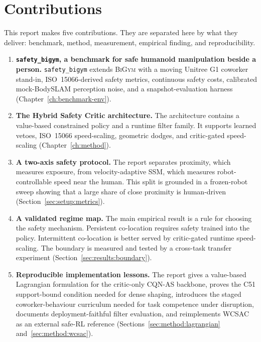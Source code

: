 \documentclass[11pt,a4paper]{report}
\newcommand{\ssm}{SSM}
\newcommand{\iso}{ISO~15066}
\newcommand{\bigym}{\textsc{BiGym}}
\newcommand{\sbigym}{\texttt{safety\_bigym}}
\newcommand{\cqnas}{CQN-AS}
\newcommand{\bodyslampp}{BodySLAM\nolinebreak[4]\hspace{-.05em}\raisebox{.2ex}{\scriptsize ++}}
\begin{document}
\section{Contributions}
\label{sec:intro:contributions}

This report makes five contributions. They are separated here by what
they deliver: benchmark, method, measurement, empirical finding, and
reproducibility.

\begin{enumerate}[leftmargin=2em,topsep=2pt,itemsep=2pt]
\item \textbf{\sbigym{}, a benchmark for safe humanoid manipulation
  beside a person.} \sbigym{} extends \bigym{} with a moving Unitree G1
  coworker stand-in, \iso{}-derived safety metrics, continuous safety
  costs, calibrated mock-\bodyslampp{} perception noise, and a
  snapshot-evaluation harness (Chapter~\ref{ch:benchmark-env}).
\item \textbf{The Hybrid Safety Critic architecture.} The architecture
  contains a value-based constrained policy and a runtime filter family.
  It supports learned vetoes, \iso{} speed-scaling, geometric dodges,
  and critic-gated speed-scaling (Chapter~\ref{ch:method}).
\item \textbf{A two-axis safety protocol.} The report separates
  proximity, which measures exposure, from velocity-adaptive \ssm{},
  which measures robot-controllable speed near the human. This split is
  grounded in a frozen-robot sweep showing that a large share of close
  proximity is human-driven (Section~\ref{sec:setup:metrics}).
\item \textbf{A validated regime map.} The main empirical result is a
  rule for choosing the safety mechanism. Persistent co-location
  requires safety trained into the policy. Intermittent co-location is
  better served by critic-gated runtime speed-scaling. The boundary is
  measured and tested by a cross-task transfer experiment
  (Section~\ref{sec:results:boundary}).
\item \textbf{Reproducible implementation lessons.} The report gives a
  value-based Lagrangian formulation for the critic-only \cqnas{}
  backbone, proves the C51 support-bound condition needed for dense
  shaping, introduces the staged coworker-behaviour curriculum needed
  for task competence under disruption, documents deployment-faithful
  filter evaluation, and reimplements WCSAC as an external safe-RL reference
  (Sections~\ref{sec:method:lagrangian} and~\ref{sec:method:wcsac}).
\end{enumerate}
\end{document}
